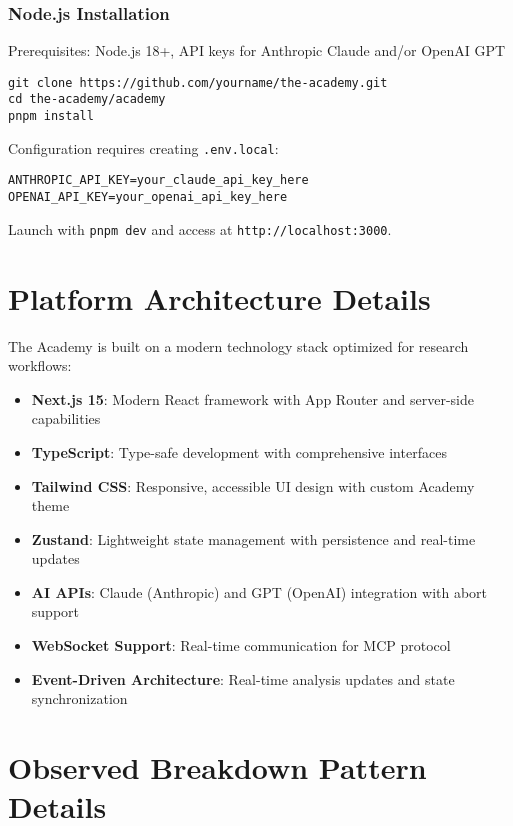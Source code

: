 \documentclass[11pt,letterpaper]{article}
\newcommand{\theacademy}{The Academy}
\begin{document}
\subsubsection{Node.js Installation}
Prerequisites: Node.js 18+, API keys for Anthropic Claude and/or OpenAI GPT

\begin{verbatim}
git clone https://github.com/yourname/the-academy.git
cd the-academy/academy
pnpm install
\end{verbatim}

Configuration requires creating \texttt{.env.local}:
\begin{verbatim}
ANTHROPIC_API_KEY=your_claude_api_key_here
OPENAI_API_KEY=your_openai_api_key_here
\end{verbatim}

Launch with \texttt{pnpm dev} and access at \texttt{http://localhost:3000}.

\section{Platform Architecture Details}
\label{app:architecture}

\theacademy{} is built on a modern technology stack optimized for research workflows:

\begin{itemize}
    \item \textbf{Next.js 15}: Modern React framework with App Router and server-side capabilities
    \item \textbf{TypeScript}: Type-safe development with comprehensive interfaces
    \item \textbf{Tailwind CSS}: Responsive, accessible UI design with custom Academy theme
    \item \textbf{Zustand}: Lightweight state management with persistence and real-time updates
    \item \textbf{AI APIs}: Claude (Anthropic) and GPT (OpenAI) integration with abort support
    \item \textbf{WebSocket Support}: Real-time communication for MCP protocol
    \item \textbf{Event-Driven Architecture}: Real-time analysis updates and state synchronization
\end{itemize}

\section{Observed Breakdown Pattern Details}
\label{app:breakdown}
\end{document}
